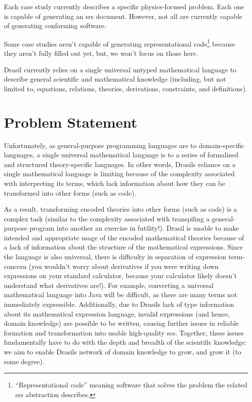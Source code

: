 \caseStudiesTable{}

Each case study currently describes a specific physics-focused problem. Each one
is capable of generating an \acs{srs} document. However, not all are currently
capable of generating conforming software.

\caseStudiesCodeTable{}

Some case studies aren't capable of generating representational
code\footnote{``Representational code'' meaning software that solves the problem
the related \acs{srs} abstraction describes.} because they aren't fully filled
out yet, but, we won't focus on those here.


Drasil currently relies on a single universal untyped mathematical language to
describe general scientific and mathematical knowledge (including, but not
limited to, equations, relations, theories, derivations, constraints, and
definitions).

\section{Problem Statement}
\label{sec:intro:problemStatement}

Unfortunately, as general-purpose programming languages are to domain-specific
languages, a single universal mathematical language is to a series of formalized
and structured theory-specific languages. In other words, Drasils reliance on a
single mathematical language is limiting because of the complexity associated
with interpreting its terms, which lack information about how they can be
transformed into other forms (such as code).

As a result, transforming encoded theories into other forms (such as code) is a
complex task (similar to the complexity associated with transpiling a
general-purpose program into another \textemdash{} an exercise in futility!). Drasil is
unable to make intended and appropriate usage of the encoded mathematical
theories because of a lack of information about the structure of the
mathematical expressions. Since the language is also universal, there is
difficulty in separation of expression term-concern (you wouldn't worry about
derivatives if you were writing down expressions on your standard calculator,
because your calculator likely doesn't understand what derivatives are!). For
example, converting a universal mathematical language into Java will be
difficult, as there are many terms not immediately expressible. Additionally,
due to Drasils lack of type information about its mathematical expression
language, invalid expressions (and hence, domain knowledge) are possible to be
written, causing further issues in reliable formation and transformation into
usable high-quality \acs{scs}. Together, these issues fundamentally have to do
with the depth and breadth of the scientific knowledge: we aim to enable Drasils
network of domain knowledge to grow, and grow it (to some degree).


